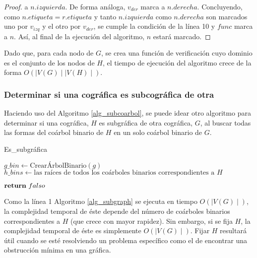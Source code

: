 \begin{proof}
a $n.izquierda$. De forma análoga, $v_{der}$ marca a $n.derecha$. Concluyendo, como $n.etiqueta = r.etiqueta$ y tanto $n.izquierda$ como $n.derecha$ son marcados uno por $v_{izq}$ y el otro por $v_{der}$, se cumple la condición de la línea 10 y $func$ marca a $n$. Así, al final de la ejecución del algoritmo, $n$ estará marcado.
    
\end{proof}

Dado que, para cada nodo de $G$, se crea una función de verificación cuyo dominio es el conjunto de los nodos de $H$, el tiempo de ejecución del algoritmo crece de la forma $O(\mid V(G) \mid \mid V(H) \mid)$. 

\subsubsection{Determinar si una cográfica es subcográfica de otra}

Haciendo uso del Algoritmo \ref{alg_subcoarbol}, se puede idear otro algoritmo para determinar si una cográfica, $H$ es subgráfica de otra cográfica, $G$, al buscar todas las formas del coárbol binario de $H$ en un solo coárbol binario de $G$. 

\begin{algorithm}[h]
\caption{Es\_subgráfica}
\label{alg_subgraph}
\DontPrintSemicolon %

$g\_bin \gets \text{CrearÁrbolBinario}(g)$\;
$h\_bins \gets \text{las raíces de todos los coárboles binarios correspondientes a } H$\;


$\Return\ falso$\;
    
\end{algorithm}

Como la línea 1 Algoritmo \ref{alg_subgraph} se ejecuta en tiempo $O(\mid V(G) \mid)$, la complejidad temporal de éste depende del número de coárboles binarios correspondientes a $H$ (que crece con mayor rapidez). Sin embargo, si se fija $H$, la complejidad temporal de éste es simplemente  $O(\mid V(G) \mid)$. Fijar $H$ resultará útil cuando se esté resolviendo un problema específico como el de encontrar una obstrucción mínima en una gráfica.